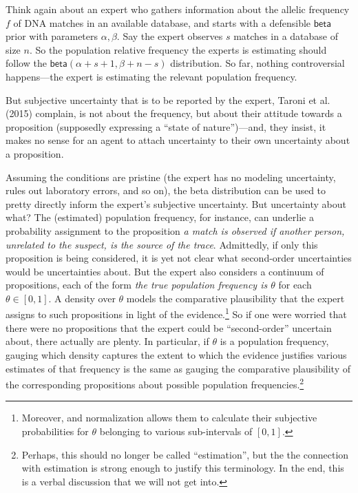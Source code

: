 \documentclass[
  10pt,
  dvipsnames,enabledeprecatedfontcommands]{scrartcl}
\newcommand{\s}[1]{\mbox{$\mathsf{#1}$}}
\begin{document}
Think again about an expert who gathers information about the allelic
frequency \(f\) of DNA matches in an available database, and starts with
a defensible \s{beta} prior with parameters \(\alpha, \beta\). Say the
expert observes \(s\) matches in a database of size \(n\). So the
population relative frequency the experts is estimating should follow
the \(\s{beta}(\alpha + s + 1 ,\beta + n - s)\) distribution. So far,
nothing controversial happens---the expert is estimating the relevant
population frequency.

But subjective uncertainty that is to be reported by the expert, Taroni
et al. (2015) complain, is not about the frequency, but about their
attitude towards a proposition (supposedly expressing a ``state of
nature'')---and, they insist, it makes no sense for an agent to attach
uncertainty to their own uncertainty about a proposition.

Assuming the conditions are pristine (the expert has no modeling
uncertainty, rules out laboratory errors, and so on), the beta
distribution can be used to pretty directly inform the expert's
subjective uncertainty. But uncertainty about what? The (estimated)
population frequency, for instance, can underlie a probability
assignment to the proposition
\emph{a match is observed  if another person, unrelated to the suspect, is the source of the trace}.
Admittedly, if only this proposition is being considered, it is yet not
clear what second-order uncertainties would be uncertainties about. But
the expert also considers a continuum of propositions, each of the form
\emph{the true population frequency is $\theta$} for each
\(\theta\in [0,1]\). A density over \(\theta\) models the comparative
plausibility that the expert assigns to such propositions in light of
the
evidence.\footnote{Moreover, and normalization allows them to calculate their subjective probabilities for $\theta$ belonging to various sub-intervals of $[0,1]$.}
So if one were worried that there were no propositions that the expert
could be ``second-order'' uncertain about, there actually are plenty.
In particular, if \(\theta\) is a population frequency, gauging which
density captures the extent to which the evidence justifies various
estimates of that frequency is the same as gauging the comparative
plausibility of the corresponding propositions about possible population
frequencies.\footnote{Perhaps, this should no longer be called
  ``estimation'', but the the connection with estimation is strong
  enough to justify this terminology. In the end, this is a verbal
  discussion that we will not get into.}
\end{document}
